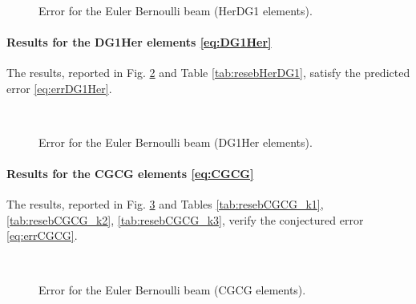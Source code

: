 \begin{figure}[htbp]%
	\centering
	\hspace{8pt}%
	 \\
	\caption{Error for the Euler Bernoulli beam (HerDG1 elements).}%
	\label{fig:errorHerDG1}%
\end{figure}


\paragraph{Results for the DG1Her elements \ref{eq:DG1Her}}
The results, reported in Fig. \ref{fig:errorDG1Her} and Table \ref{tab:resebHerDG1}, satisfy the predicted error \eqref{eq:errDG1Her}.

\begin{figure}[htbp]%
	\centering
	\hspace{8pt}%
	 \\
	\caption{Error for the Euler Bernoulli beam (DG1Her elements).}%
	\label{fig:errorDG1Her}%
\end{figure}

\paragraph{Results for the CGCG elements \ref{eq:CGCG}}
The results, reported in Fig. \ref{fig:errorCGCG} and Tables \ref{tab:resebCGCG_k1}, \ref{tab:resebCGCG_k2}, \ref{tab:resebCGCG_k3}, verify the conjectured error \eqref{eq:errCGCG}.

\begin{figure}[htbp]%
	\centering
	\hspace{8pt}%
	 \\
	\caption{Error for the Euler Bernoulli beam (CGCG elements).}%
	\label{fig:errorCGCG}%
\end{figure}

